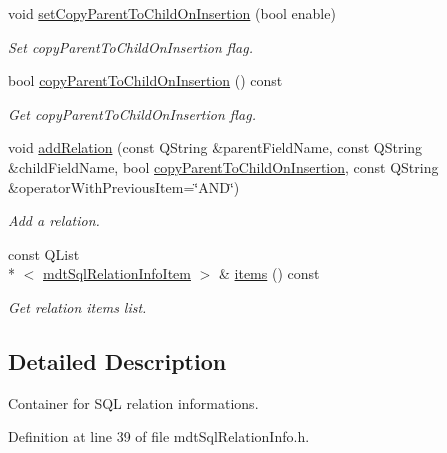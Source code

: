 \begin{DoxyCompactItemize}
void \hyperlink{classmdt_sql_relation_info_a67f5ae2032eb1a4a05761d94c9df267c}{set\-Copy\-Parent\-To\-Child\-On\-Insertion} (bool enable)
\begin{DoxyCompactList}\small\item\em Set copy\-Parent\-To\-Child\-On\-Insertion flag. \end{DoxyCompactList}\item 
bool \hyperlink{classmdt_sql_relation_info_a2b6d4736c32243e7e7d059aa62bd866f}{copy\-Parent\-To\-Child\-On\-Insertion} () const 
\begin{DoxyCompactList}\small\item\em Get copy\-Parent\-To\-Child\-On\-Insertion flag. \end{DoxyCompactList}\item 
void \hyperlink{classmdt_sql_relation_info_a2e1c524c9e6db3d5359c2639a794f65f}{add\-Relation} (const Q\-String \&parent\-Field\-Name, const Q\-String \&child\-Field\-Name, bool \hyperlink{classmdt_sql_relation_info_a2b6d4736c32243e7e7d059aa62bd866f}{copy\-Parent\-To\-Child\-On\-Insertion}, const Q\-String \&operator\-With\-Previous\-Item=\char`\"{}A\-N\-D\char`\"{})
\begin{DoxyCompactList}\small\item\em Add a relation. \end{DoxyCompactList}\item 
const Q\-List\\*
$<$ \hyperlink{structmdt_sql_relation_info_item}{mdt\-Sql\-Relation\-Info\-Item} $>$ \& \hyperlink{classmdt_sql_relation_info_ac3978c4426c21c2a3db3bc3ad008aa8f}{items} () const 
\begin{DoxyCompactList}\small\item\em Get relation items list. \end{DoxyCompactList}\end{DoxyCompactItemize}


\subsection{Detailed Description}
Container for S\-Q\-L relation informations. 

Definition at line 39 of file mdt\-Sql\-Relation\-Info.\-h.




